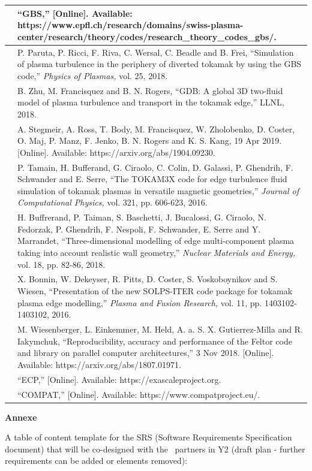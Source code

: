 \documentclass{article}
\begin{document}
\begin{tabular}{|>{\raggedright}p{8pt}|>{\raggedright}p{312pt}|}
\hline
[14]  & ``GBS,'' [Online]. Available: https://www.epfl.ch/research/domains/swiss-plasma-center/research/theory/codes/research\_theory\_codes\_gbs/.\tabularnewline
\hline
[15]  & P. Paruta, P. Ricci, F. Riva, C. Wersal, C. Beadle and B. Frei, ``Simulation 
of plasma turbulence in the periphery of diverted tokamak by using the GBS code,'' 
\textit{Physics of Plasmas, }vol. 25, 2018. \tabularnewline
\hline
[16]  & B. Zhu, M. Francisquez and B. N. Rogers, ``GDB: A global 3D two-fluid model 
of plasma turbulence and transport in the tokamak edge,'' LLNL, 2018.\tabularnewline
\hline
[17]  & A. Stegmeir, A. Ross, T. Body, M. Francisquez, W. Zholobenko, D. Coster, 
O. Maj, P. Manz, F. Jenko, B. N. Rogers and K. S. Kang, 19 Apr 2019. [Online]. 
Available: https://arxiv.org/abs/1904.09230.\tabularnewline
\hline
[18]  & P. Tamain, H. Bufferand, G. Ciraolo, C. Colin, D. Galassi, P. Ghendrih, 
F. Schwander and E. Serre, ``The TOKAM3X code for edge turbulence fluid simulation 
of tokamak plasmas in versatile magnetic geometries,'' \textit{Journal of Computational 
Physics, }vol. 321, pp. 606-623, 2016. \tabularnewline
\hline
[19]  & H. Buffrerand, P. Taiman, S. Baschetti, J. Bucalossi, G. Ciraolo, N. Fedorzak, 
P. Ghendrih, F. Nespoli, F. Schwander, E. Serre and Y. Marrandet, ``Three-dimensional 
modelling of edge multi-component plasma taking into account realistic wall geometry,'' 
\textit{Nuclear Materials and Energy, }vol. 18, pp. 82-86, 2018. \tabularnewline
\hline
[20]  & X. Bonnin, W. Dekeyser, R. Pitts, D. Coster, S. Voskoboynikov and S. Wiesen, 
``Presentation of the new SOLPS-ITER code package for tokamak plasma edge modelling,'' 
\textit{Plasma and Fusion Research, }vol. 11, pp. 1403102-1403102, 2016. \tabularnewline
\hline
[21]  & M. Wiesenberger, L. Einkemmer, M. Held, A. a. S. X. Gutierrez-Milla and 
R. Iakymchuk, ``Reproducibility, accuracy and performance of the Feltor code and 
library on parallel computer architectures,'' 3 Nov 2018. [Online]. Available: 
https://arxiv.org/abs/1807.01971.\tabularnewline
\hline
[22]  & ``ECP,'' [Online]. Available: https://exascaleproject.org.\tabularnewline
\hline
[23]  & ``COMPAT,'' [Online]. Available: https://www.compatproject.eu/.\tabularnewline
\hline
\end{tabular}\pagebreak{}

{\huge{}{ \textbf{Annexe}}}

\baselineskip=18pt
{ A table of content template for the SRS (Software Requirements 
Specification document) that will be co-designed with the \exc \   partners in 
Y2 (draft plan - further requirements can be added or elements removed):}
\end{document}
